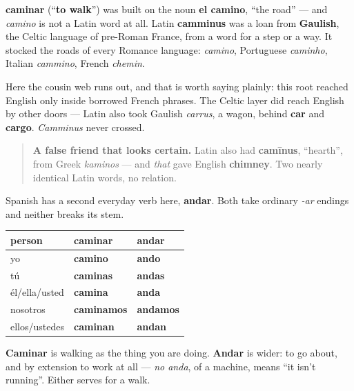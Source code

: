 \begin{cousinweb}
\textbf{caminar} (\textquotedblleft{}\textbf{to walk}\textquotedblright{}) was built on the noun \textbf{el camino}, \textquotedblleft{}the road\textquotedblright{} — and \emph{camino} is not a Latin word at all. Latin \textbf{camminus} was a loan from \textbf{Gaulish}, the Celtic language of pre-Roman France, from a word for a step or a way. It stocked the roads of every Romance language: \emph{camino}, Portuguese \emph{caminho}, Italian \emph{cammino}, French \emph{chemin}.

Here the cousin web runs out, and that is worth saying plainly: this root reached English only inside borrowed French phrases. The Celtic layer did reach English by other doors — Latin also took Gaulish \emph{carrus}, a wagon, behind \textbf{car} and \textbf{cargo}. \emph{Camminus} never crossed.

\begin{quote}
\textbf{A false friend that looks certain.} Latin also had \textbf{camīnus}, \textquotedblleft{}hearth\textquotedblright{}, from Greek \emph{kaminos} — and \emph{that} gave English \textbf{chimney}. Two nearly identical Latin words, no relation.
\end{quote}
\end{cousinweb}

\begin{grammarlens}[title={Grammar Lens: two plain verbs, and which to reach for}]
Spanish has a second everyday verb here, \textbf{andar}. Both take ordinary \emph{-ar} endings and neither breaks its stem.

\noindent
\begin{tabularx}{\linewidth}{@{}>{\raggedright\arraybackslash}X>{\raggedright\arraybackslash}X>{\raggedright\arraybackslash}X@{}}
\toprule
\textbf{person} & \textbf{caminar} & \textbf{andar} \\
\midrule
yo & \textbf{camino} & \textbf{ando} \\
tú & \textbf{caminas} & \textbf{andas} \\
él/ella/usted & \textbf{camina} & \textbf{anda} \\
nosotros & \textbf{caminamos} & \textbf{andamos} \\
ellos/ustedes & \textbf{caminan} & \textbf{andan} \\
\bottomrule
\end{tabularx}

\textbf{Caminar} is walking as the thing you are doing. \textbf{Andar} is wider: to go about, and by extension to work at all — \emph{no anda}, of a machine, means \textquotedblleft{}it isn't running\textquotedblright{}. Either serves for a walk.
\end{grammarlens}

